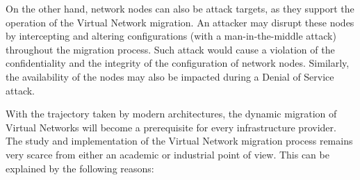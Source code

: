 On the other hand, network nodes can also be attack targets, as they support the operation of the Virtual Network migration.
An attacker may disrupt these nodes by intercepting and altering configurations (\eg with a man-in-the-middle attack) throughout the migration process.
Such attack would cause a violation of the confidentiality and the integrity of the configuration of network nodes. Similarly, the availability of the nodes may also be impacted during a Denial of Service attack.

With the trajectory taken by modern architectures, the dynamic migration of Virtual Networks will become a prerequisite for every infrastructure provider.
The study and implementation of the Virtual Network migration process remains very scarce from either an academic or industrial point of view. This can be explained by the following reasons:

